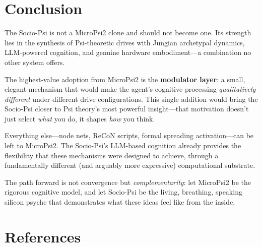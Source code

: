 \documentclass[11pt,letterpaper]{article}
\begin{document}
\section{Conclusion}

The Socio-Psi is not a MicroPsi2 clone and should not become one. Its
strength lies in the synthesis of Psi-theoretic drives with Jungian
archetypal dynamics, LLM-powered cognition, and genuine hardware
embodiment---a combination no other system offers.

The highest-value adoption from MicroPsi2 is the \textbf{modulator layer}:
a small, elegant mechanism that would make the agent's cognitive processing
\emph{qualitatively different} under different drive configurations. This
single addition would bring the Socio-Psi closer to Psi theory's most
powerful insight---that motivation doesn't just select \emph{what} you
do, it shapes \emph{how} you think.

Everything else---node nets, ReCoN scripts, formal spreading
activation---can be left to MicroPsi2. The Socio-Psi's LLM-based cognition
already provides the flexibility that these mechanisms were designed to
achieve, through a fundamentally different (and arguably more expressive)
computational substrate.

The path forward is not convergence but \emph{complementarity}: let
MicroPsi2 be the rigorous cognitive model, and let Socio-Psi be the
living, breathing, speaking silicon psyche that demonstrates what these
ideas feel like from the inside.

\section*{References}
\end{document}
